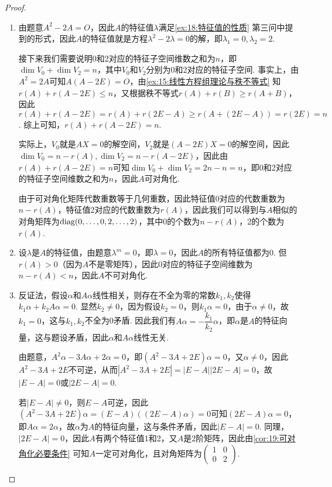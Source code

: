\begin{proof}
    \begin{enumerate}
        \item 由题意$A^2-2A=O$，因此$A$的特征值$\lambda$满足\autoref{ex:18:特征值的性质} 第三问中提到的形式，因此$A$的特征值就是方程$\lambda^2-2\lambda=0$的解，即$\lambda_1=0,\lambda_2=2$.

              接下来我们需要说明0和2对应的特征子空间维数之和为$n$，即$\dim V_0+\dim V_2=n$，其中$V_0$和$V_2$分别为0和2对应的特征子空间. 事实上，由$A^2=2A$可知$A(A-2E)=O$，由\autoref{ex:15:线性方程组理论与秩不等式} 知$r(A)+r(A-2E)\leqslant n$，又根据秩不等式$r(A)+r(B)\geqslant r(A+B)$，因此$r(A)+r(A-2E)=r(A)+r(2E-A)\geqslant r(A+(2E-A))=r(2E)=n$. 综上可知，$r(A)+r(A-2E)=n$.

              实际上，$V_0$就是$AX=0$的解空间，$V_2$就是$(A-2E)X=0$的解空间，因此$\dim V_0=n-r(A),\dim V_2=n-r(A-2E)$，因此由$r(A)+r(A-2E)=n$可知$\dim V_0+\dim V_2=2n-n=n$，即0和2对应的特征子空间维数之和为$n$，因此$A$可对角化.

              由于可对角化矩阵代数重数等于几何重数，因此特征值0对应的代数重数为$n-r(A)$，特征值2对应的代数重数为$r(A)$，因此我们可以得到与$A$相似的对角矩阵为$\operatorname{diag}(0,\ldots,0,2,\ldots,2)$，其中0的个数为$n-r(A)$，2的个数为$r(A)$.

        \item 设$\lambda$是$A$的特征值，由题意$\lambda^m=0$，即$\lambda=0$，因此$A$的所有特征值都为0. 但$r(A)>0$（因为$A$不是零矩阵），因此0对应的特征子空间维数为$n-r(A)<n$，因此$A$不可对角化.

        \item 反证法，假设$\alpha$和$A\alpha$线性相关，则存在不全为零的常数$k_1,k_2$使得$k_1\alpha+k_2A\alpha=0$. 显然$k_2\neq 0$，因为假设$k_2=0$，则$k_1\alpha=0$，由于$\alpha\neq 0$，故$k_1=0$，这与$k_1,k_2$不全为0矛盾. 因此我们有$A\alpha=-\dfrac{k_1}{k_2}\alpha$，即$\alpha$是$A$的特征向量，这与题设矛盾，因此$\alpha$和$A\alpha$线性无关.

              由题意，$A^2\alpha-3A\alpha+2\alpha=0$，即$(A^2-3A+2E)\alpha=0$，又$\alpha\neq 0$，因此$A^2-3A+2E$不可逆，从而$|A^2-3A+2E|=|E-A||2E-A|=0$，故$|E-A|=0$或$|2E-A|=0$.

              若$|E-A|\neq 0$，则$E-A$可逆，因此$(A^2-3A+2E)\alpha=(E-A)((2E-A)\alpha)=0$可知$(2E-A)\alpha=0$，即$A\alpha=2\alpha$，故$\alpha$为$A$的特征向量，这与条件矛盾，因此$|E-A|=0$. 同理，$|2E-A|=0$，因此$A$有两个特征值1和2，又$A$是2阶矩阵，因此由\autoref{cor:19:可对角化必要条件} 可知$A$一定可对角化，且对角矩阵为$\begin{pmatrix}
                      1 & 0 \\
                      0 & 2
                  \end{pmatrix}$.
    \end{enumerate}
\end{proof}

